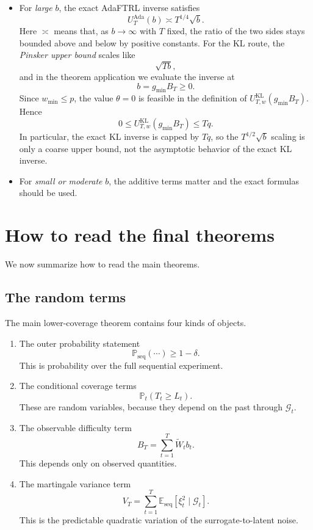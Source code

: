 \documentclass[11pt]{article}
\newcommand{\E}{\mathbb{E}}
\newcommand{\Prob}{\mathbb{P}}
\newcommand{\1}{\mathbf{1}}
\newcommand{\seq}{\mathrm{seq}}
\newcommand{\cG}{\mathcal{G}}
\begin{document}
\begin{itemize}[leftmargin=*,itemsep=2pt]
  \item For \emph{large} \(b\), the exact AdaFTRL inverse satisfies
  \[
  U_T^{\mathrm{Ada}}(b)\asymp T^{1/4}\sqrt{b}.
  \]
  Here \(\asymp\) means that, as \(b\to\infty\) with \(T\) fixed, the ratio of the two sides stays bounded above and below by positive constants. For the KL route, the \emph{Pinsker upper bound} scales like
  \[
  \sqrt{Tb},
  \]
  and in the theorem application we evaluate the inverse at
  \[
  b=g_{\min}B_T\ge 0.
  \]
  Since \(w_{\min}\le p\), the value \(\theta=0\) is feasible in the definition of \(U_{T,w}^{\mathrm{KL}}(g_{\min}B_T)\). Hence
  \[
  0\le U_{T,w}^{\mathrm{KL}}(g_{\min}B_T)\le Tq.
  \]
  In particular, the exact KL inverse is capped by \(Tq\), so the \(T^{1/2}\sqrt b\) scaling is only a coarse upper bound, not the asymptotic behavior of the exact KL inverse.
  \item For \emph{small or moderate} \(b\), the additive terms matter and the exact formulas should be used.
\end{itemize}

\section{How to read the final theorems}

We now summarize how to read the main theorems.

\subsection{The random terms}

The main lower-coverage theorem contains four kinds of objects.

\begin{enumerate}[leftmargin=*,itemsep=2pt]
  \item The outer probability statement
  \[
  \Prob_{\seq}(\cdots)\ge 1-\delta.
  \]
  This is probability over the full sequential experiment.

  \item The conditional coverage terms
  \[
  \Prob_t(T_t\ge L_t).
  \]
  These are random variables, because they depend on the past through $\cG_t$.

  \item The observable difficulty term
  \[
  B_T=\sum_{t=1}^T \widetilde W_t b_t.
  \]
  This depends only on observed quantities.

  \item The martingale variance term
  \[
  V_T=\sum_{t=1}^T \E_{\seq}[\xi_t^2\mid \cG_t].
  \]
  This is the predictable quadratic variation of the surrogate-to-latent noise.
\end{enumerate}
\end{document}
